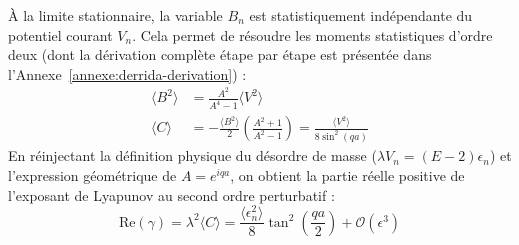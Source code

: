 À la limite stationnaire, la variable $B_n$ est statistiquement indépendante du potentiel courant $V_n$. Cela permet de résoudre les moments statistiques d'ordre deux (dont la dérivation complète étape par étape est présentée dans l'Annexe~\ref{annexe:derrida-derivation}) :
\begin{align}
    \langle B^2 \rangle &= \frac{A^2}{A^4 - 1}\langle V^2 \rangle \\
    \langle C \rangle &= -\frac{\langle B^2 \rangle}{2} \left( \frac{A^2 + 1}{A^2 - 1} \right) = \frac{\langle V^2 \rangle}{8\sin^2(qa)}
\end{align}
En réinjectant la définition physique du désordre de masse ($\lambda V_n = (E-2)\epsilon_n$) et l'expression géométrique de $A = e^{iqa}$, on obtient la partie réelle positive de l'exposant de Lyapunov au second ordre perturbatif :
\begin{equation}
    \text{Re}(\gamma) = \lambda^2 \langle C \rangle = \frac{\langle\epsilon_n^2\rangle}{8} \tan^2\left(\frac{qa}{2}\right) + \mathcal{O}(\epsilon^3)
    \label{eq:lyapunov_derrida_final}
\end{equation}
